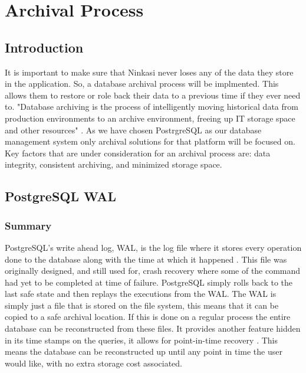 \documentclass[draftclsnofoot,onecolumn,journal,letterpaper,compsoc,10pt]{IEEEtran}
\begin{document}
\section{Archival Process}

    \subsection{Introduction}
    
    It is important to make sure that Ninkasi never loses any of the data they store in the application.  So, a database archival process will be implmented.  This allows them to restore or role back their data to a previous time if they ever need to.  "Database archiving is the process of intelligently moving historical data from production environments to an archive environment, freeing up IT storage space and other resources" \cite{ibm_archiving}.  As we have chosen PostrgreSQL as our database management system only archival solutions for that platform will be focused on.  Key factors that are under consideration for an archival process are: data integrity, consistent archiving, and minimized storage space.
    
    \subsection{PostgreSQL WAL}
    
        \subsubsection{Summary}
        
        PostgreSQL's write ahead log, WAL, is the log file where it stores every operation done to the database along with the time at which it happened \cite{postgresql_wal}.  This file was originally designed, and still used for, crash recovery where some of the command had yet to be completed at time of failure.  PostgreSQL simply rolls back to the last safe state and then replays the executions from the WAL.  The WAL is simply just a file that is stored on the file system, this means that it can be copied to a safe archival location.  If this is done on a regular process the entire database can be reconstructed from these files.  It provides another feature hidden in its time stamps on the queries, it allows for point-in-time recovery \cite{postgresql_wal}.  This means the database can be reconstructed up until any point in time the user would like, with no extra storage cost associated.
        
\end{document}
